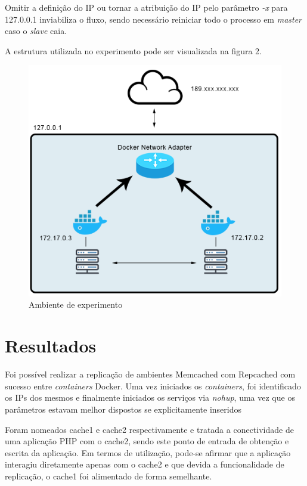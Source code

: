 \documentclass[conference]{IEEEtran}
\begin{document}
Omitir a definição do IP ou tornar a atribuição do IP pelo parâmetro \textit{-x} para 127.0.0.1 inviabiliza o fluxo, sendo necessário reiniciar todo o processo em \textit{master} caso o \textit{slave} caia. 

A estrutura utilizada no experimento pode ser visualizada na figura 2.

\begin{figure}[h!]
\centerline{\includegraphics[width=1\linewidth]{figura2.png}}
\caption{Ambiente de experimento}
\label{fig}
\end{figure}

\section{Resultados} 

Foi possível realizar a replicação de ambientes Memcached com Repcached com sucesso entre \textit{containers} Docker. Uma vez iniciados os \textit{containers}, foi identificado os IPs dos mesmos e finalmente iniciados os serviços via \textit{nohup}, uma vez que os parâmetros estavam melhor dispostos se explicitamente inseridos

Foram nomeados cache1 e cache2 respectivamente e tratada a conectividade de uma aplicação PHP com o cache2, sendo este ponto de entrada de obtenção e escrita da aplicação. Em termos de utilização, pode-se afirmar que a aplicação interagiu diretamente apenas com o cache2 e que devida a funcionalidade de replicação, o cache1 foi alimentado de forma semelhante.
\end{document}
